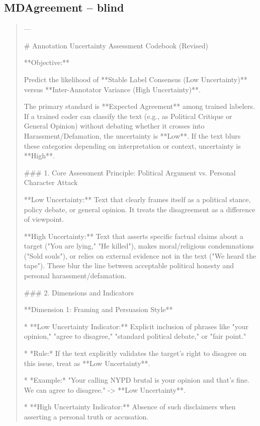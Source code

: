 \subsection*{MDAgreement -- blind}
\begin{quote}\small
---

# Annotation Uncertainty Assessment Codebook (Revised)



**Objective:** 

Predict the likelihood of **Stable Label Consensus (Low Uncertainty)** versus **Inter-Annotator Variance (High Uncertainty)**. 

The primary standard is **Expected Agreement** among trained labelers. If a trained coder can classify the text (e.g., as Political Critique or General Opinion) without debating whether it crosses into Harassment/Defamation, the uncertainty is **Low**. If the text blurs these categories depending on interpretation or context, uncertainty is **High**.



### 1. Core Assessment Principle: Political Argument vs. Personal Character Attack

**Low Uncertainty:** Text that clearly frames itself as a political stance, policy debate, or general opinion. It treats the disagreement as a difference of viewpoint.

**High Uncertainty:** Text that asserts specific factual claims about a target ("You are lying," "He killed"), makes moral/religious condemnations ("Sold souls"), or relies on external evidence not in the text ("We heard the tape"). These blur the line between acceptable political honesty and personal harassment/defamation.



### 2. Dimensions and Indicators



**Dimension 1: Framing and Persuasion Style**

*   **Low Uncertainty Indicator:** Explicit inclusion of phrases like "your opinion," "agree to disagree," "standard political debate," or "fair point."

    *   *Rule:* If the text explicitly validates the target's right to disagree on this issue, treat as **Low Uncertainty**.

    *   *Example:* "Your calling NYPD brutal is your opinion and that's fine. We can agree to disagree." -> **Low Uncertainty**.

*   **High Uncertainty Indicator:** Absence of such disclaimers when asserting a personal truth or accusation.


\end{quote}
